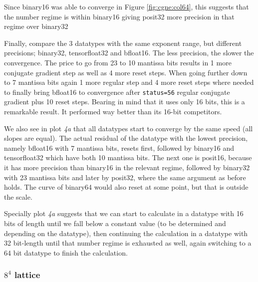 \documentclass{article}
\theoremstyle{plain} %
\theoremstyle{convention} %
\theoremstyle{remark} %
\def\code#1{\texttt{#1}}
\numberwithin{equation}{section}
\begin{document}
Since \gls{binary16} was able to converge in Figure \ref{fig:cgne:col64}, this suggests that the number regime is within \gls{binary16} giving \gls{posit32} more precision in that regime over \gls{binary32}

Finally, compare the \num{3} datatypes with the same exponent range, but different precisions; \gls{binary32}, \gls{tensorfloat32} and \gls{bfloat16}. The less precision, the slower the convergence. The price to go from \num{23} to \num{10} mantissa bits results in \num{1} more conjugate gradient step as well as \num{4} more reset steps. When going further down to \num{7} mantissa bits again \num{1} more regular step and \num{4} more reset steps where needed to finally bring \gls{bfloat16} to convergence after \code{status=56} regular conjugate gradient plus \num{10} reset steps. Bearing in mind that it uses only \num{16} bits, this is a remarkable result. It performed way better than its \num{16}-bit competitors.

We also see in plot \textit{4a} that all datatypes start to converge by the same speed (all slopes are equal). The actual residual of the datatype with the lowest precision, namely \gls{bfloat16} with \num{7} mantissa bits, resets first, followed by \gls{binary16} and \gls{tensorfloat32} which have both \num{10} mantissa bits. The next one is \gls{posit16}, because it has more precision than \gls{binary16} in the relevant regime, followed by \gls{binary32} with \num{23} mantissa bits and later by \gls{posit32}, where the same argument as before holds. The curve of \gls{binary64} would also reset at some point, but that is outside the scale.

Specially plot \textit{4a} suggests that we can start to calculate in a datatype with \num{16} bits of length until we fall below a constant value (to be determined and depending on the datatype), then continuing the calculation in a datatype with \num{32} bit-length until that number regime is exhausted as well, again switching to a \num{64} bit datatype to finish the calculation.

\subsubsection{$8^4$ lattice}
\end{document}
